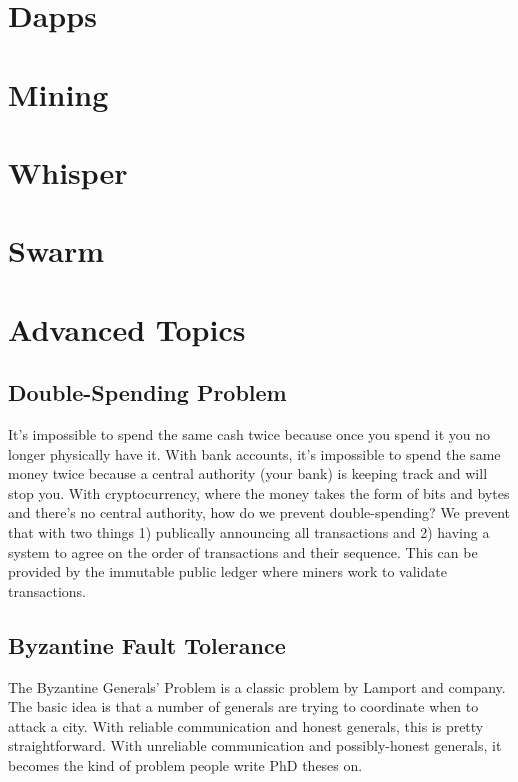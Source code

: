 \documentclass{article}
\begin{document}
\section{Dapps}

\section{Mining}

\section{Whisper}

\section{Swarm}

\section{Advanced Topics}

\subsection{Double-Spending Problem}
It's impossible to spend the same cash twice because once you spend it you no longer physically have it. With bank accounts, it's impossible to spend the same money twice because a central authority (your bank) is keeping track and will stop you. With
cryptocurrency, where the money takes the form of bits and bytes and there's no central authority, how do we prevent double-spending? We prevent that with two things 1) publically announcing all transactions and 2) having a system to agree on the order
of transactions and their sequence. This can be provided by the immutable public ledger where miners work to validate transactions.

\subsection{Byzantine Fault Tolerance}
The Byzantine Generals' Problem is a classic problem by Lamport and company. The basic idea is that a number of generals are trying
to coordinate when to attack a city. With reliable communication and honest generals, this is pretty straightforward. With
unreliable communication and possibly-honest generals, it becomes the kind of problem people write PhD theses on.
\end{document}
